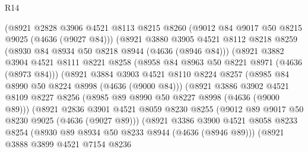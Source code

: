 \begin{lexlean}{R14}
\begin{coremodule}
                      (@8921
                        @2828
                        @3906
                        @4521
                        @8113
                        @8215
                        @8260
                        (@9012 @84 @9017 @50 @8215 @9025 (@4636 (@9027 @84)))
                        (@8921
                          @3880
                          @3905
                          @4521
                          @8112
                          @8218
                          @8259
                          (@8930 @84 @8934 @50 @8218 @8944 (@4636 (@8946 @84)))
                          (@8921
                            @3882
                            @3904
                            @4521
                            @8111
                            @8221
                            @8258
                            (@8958 @84 @8963 @50 @8221 @8971 (@4636 (@8973 @84)))
                            (@8921
                              @3884
                              @3903
                              @4521
                              @8110
                              @8224
                              @8257
                              (@8985 @84 @8990 @50 @8224 @8998 (@4636 (@9000 @84)))
                              (@8921
                                @3886
                                @3902
                                @4521
                                @8109
                                @8227
                                @8256
                                (@8985 @89 @8990 @50 @8227 @8998 (@4636 (@9000 @89)))
                                (@8921
                                  @2836
                                  @3901
                                  @4521
                                  @8059
                                  @8230
                                  @8255
                                  (@9012 @89 @9017 @50 @8230 @9025 (@4636 (@9027 @89)))
                                  (@8921
                                    @3386
                                    @3900
                                    @4521
                                    @8058
                                    @8233
                                    @8254
                                    (@8930 @89 @8934 @50 @8233 @8944 (@4636 (@8946 @89)))
                                    (@8921
                                      @3888
                                      @3899
                                      @4521
                                      @7154
                                      @8236

\end{coremodule}
\end{lexlean}

